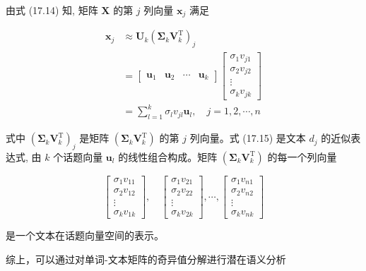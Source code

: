 \documentclass[10pt]{article}
\begin{document}
由式 (17.14) 知, 矩阵 $\boldsymbol{X}$ 的第 $j$ 列向量 $\boldsymbol{x}_{j}$ 满足


\begin{align*}
\boldsymbol{x}_{j} & \approx \boldsymbol{U}_{k}\left(\boldsymbol{\Sigma}_{k} \boldsymbol{V}_{k}^{\mathrm{T}}\right)_{j} \\
& =\left[\begin{array}{llll}
\boldsymbol{u}_{1} & \boldsymbol{u}_{2} & \cdots & \boldsymbol{u}_{k}
\end{array}\right]\left[\begin{array}{c}
\sigma_{1} v_{j 1} \\
\sigma_{2} v_{j 2} \\
\vdots \\
\sigma_{k} v_{j k}
\end{array}\right] \\
& =\sum_{l=1}^{k} \sigma_{l} v_{j l} \boldsymbol{u}_{l}, \quad j=1,2, \cdots, n \tag{17.15}
\end{align*}


式中 $\left(\boldsymbol{\Sigma}_{k} \boldsymbol{V}_{k}^{\mathrm{T}}\right)_{j}$ 是矩阵 $\left(\boldsymbol{\Sigma}_{k} \boldsymbol{V}_{k}^{\mathrm{T}}\right)$ 的第 $j$ 列向量。式 (17.15) 是文本 $d_{j}$ 的近似表达式, 由 $k$ 个话题向量 $\boldsymbol{u}_{l}$ 的线性组合构成。矩阵 $\left(\boldsymbol{\Sigma}_{k} \boldsymbol{V}_{k}^{\mathrm{T}}\right)$ 的每一个列向量

$$
\left[\begin{array}{c}
\sigma_{1} v_{11} \\
\sigma_{2} v_{12} \\
\vdots \\
\sigma_{k} v_{1 k}
\end{array}\right], \quad\left[\begin{array}{c}
\sigma_{1} v_{21} \\
\sigma_{2} v_{22} \\
\vdots \\
\sigma_{k} v_{2 k}
\end{array}\right], \cdots,\left[\begin{array}{c}
\sigma_{1} v_{n 1} \\
\sigma_{2} v_{n 2} \\
\vdots \\
\sigma_{k} v_{n k}
\end{array}\right]
$$

是一个文本在话题向量空间的表示。

综上，可以通过对单词-文本矩阵的奇异值分解进行潜在语义分析
\end{document}
